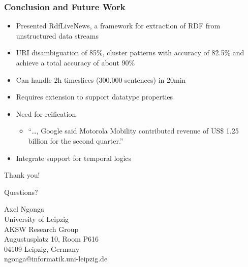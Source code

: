 \documentclass{beamer}
\begin{document}

\begin{frame}
    \frametitle{Conclusion and Future Work}
    \begin{itemize}
		\item Presented RdfLiveNews, a framework for extraction of RDF from unstructured data streams
		\item URI disambiguation of 85\%, cluster patterns with accuracy of 82.5\% and achieve a total accuracy of about 90\%  
		\item Can handle 2h timeslices (300.000 sentences) in 20min
\pause
		\item Requires extension to support datatype properties
		\item Need for reification
		\begin{itemize}
	   		\item “\dots , Google said Motorola Mobility contributed revenue of
US\$ 1.25 billion for the second quarter.”		
    	\end{itemize}
		\item Integrate support for temporal logics
    \end{itemize}
\end{frame}

\begin{frame}{}
\begin{center}
\vspace{2cm}
\Huge{Thank you!}

\Huge{Questions?}
\end{center}

\begin{flushright}
Axel Ngonga \\
University of Leipzig \\
AKSW Research Group \\
Augustusplatz 10, Room P616 \\
04109 Leipzig, Germany \\
ngonga@informatik.uni-leipzig.de
\end{flushright}

\end{frame}
\end{document}

